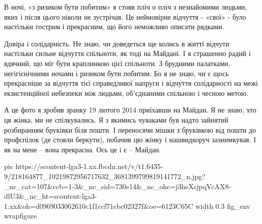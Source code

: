 В ночі, «з ризиком бути побитим» я стояв пліч о пліч з незнайомими людьми, яких
і після цього ніколи не зустрічав. Це неймовірне відчуття  - «свої» - було
настільки гострим і прекрасним, що його неможливо описати рядками. 

Довіра і солідарність. Не знаю, чи доведеться ще колись в житті відчути
настільки сильне відчуття спільноти, як тоді на Майдані. І я страшенно радий і
вдячний, що міг бути краплинкою цієї спільноти. З брудними палатками,
негігієнічними ночами і ризиком бути побитим. Бо я не знаю, чи є щось
прекрасніше за відчуття тієї справедливої напруги і відчуття солідарності на
межі екзистенційної небезпеки між людьми, об’єднаними спільною і чесною метою.

А це фото я зробив зранку 19 лютого 2014 приїхавши на Майдан. Я не знаю, хто ця
жінка, ми не спілкувались. Я з якимись чуваками був надто зайнятий розбиранням
бруківки біля пошти. І переносячи мішки з бруківкою  від пошти до профспілок
(де стояли беркути), побачив цю жінку і нашвидкоруч зазнимкував. І як на мене –
вона прекрасна. Ось це і є – Майдан.

\ifcmt
  pic https://scontent-lga3-1.xx.fbcdn.net/v/t1.6435-9/218164877_10219872956717632_3681399799819141772_n.jpg?_nc_cat=107&ccb=1-3&_nc_sid=730e14&_nc_ohc=j3heXsjpqVcAX8-dlU3&_nc_ht=scontent-lga3-1.xx&oh=d0969033062610c1f1ccf71cbc02327f&oe=6123C65C
  width 0.3
	fig_env wrapfigure
\fi
